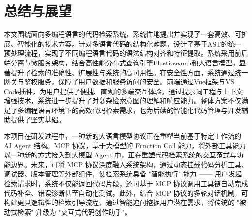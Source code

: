 \documentclass[UTF8,a4paper,12pt]{ctexart}
\numberwithin{equation}{section}
\begin{document}
\section{总结与展望}
本文围绕面向多编程语言的代码检索系统，系统性地提出并实现了一套高效、可扩展、智能化的技术方案。针对多语言代码的结构化难题，设计了基于AST的统一预处理流程，实现了不同编程语言代码的语法结构对齐和特征提取。系统采用前后端分离与微服务架构，结合高性能分布式查询引擎Elasticsearch和大语言模型，显著提升了检索的准确性、扩展性与系统的高可用性。在安全性方面，系统通过统一网关与鉴权服务，保障了用户数据和服务访问的安全。前端通过Vue框架与VS Code插件，为用户提供了便捷、直观的多端交互体验。通过提示词工程与上下文增强技术，系统进一步提升了对复杂检索意图的理解和响应能力。整体方案不仅满足了多编程语言环境下的高效代码检索需求，也为后续的智能化代码管理与开发辅助提供了坚实基础。\par
本项目在研发过程中，一种新的大语言模型协议正在重塑当前基于特定工作流的 AI Agent 结构。MCP 协议，基于大模型的 Function Call 能力，将外部工具能力以一种新的方式接入到大模型 Agent 中，正在重塑代码检索系统的交互范式与功能边界。未来，可将 MCP 协议深度融入系统架构，通过动态挂载代码分析工具、调试器、版本管理等外部组件，使检索系统具备 "智能执行" 能力 —— 用户发起检索请求时，系统不仅能返回代码片段，还可基于 MCP 协议调用工具链自动完成代码补全、错误诊断甚至自动化测试。此外，结合 MCP 协议的多轮对话机制，可构建更具逻辑性的检索引导流程，通过智能追问挖掘用户潜在需求，将传统的 "被动式检索" 升级为 "交互式代码创作助手"。\par

\newpage
{}

\renewcommand\refname{参考文献}

\end{document}
